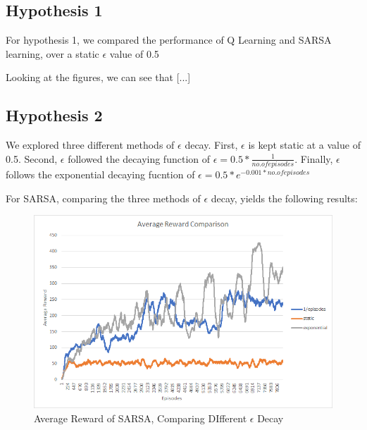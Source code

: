 \documentclass[nohyperref]{article}
\theoremstyle{plain}
\theoremstyle{definition}
\theoremstyle{remark}
\begin{document}

\subsection{Hypothesis 1}

For hypothesis 1, we compared the performance of Q Learning and SARSA learning, over a static $\epsilon$ value of 0.5

Looking at the figures, we can see that [...]

\subsection{Hypothesis 2}

We explored three different methods of $\epsilon$ decay. First, $\epsilon$ is kept static at a value of 0.5. Second, 
$\epsilon$ followed the decaying function of $\epsilon = 0.5 * \frac{1}{no. of episodes}$. Finally,
$\epsilon$ follows the exponential decaying fucntion of $\epsilon = 0.5 * e^{-0.001*no. of episodes}$

For SARSA, comparing the three methods of $\epsilon$ decay, yields the following results:

\begin{figure}[H] %
    \centering
    \includegraphics[width=1\linewidth]{epsilon-decay-comparison.png}
    \caption{Average Reward of SARSA, Comparing DIfferent $\epsilon$ Decay}
\end{figure}
\end{document}
